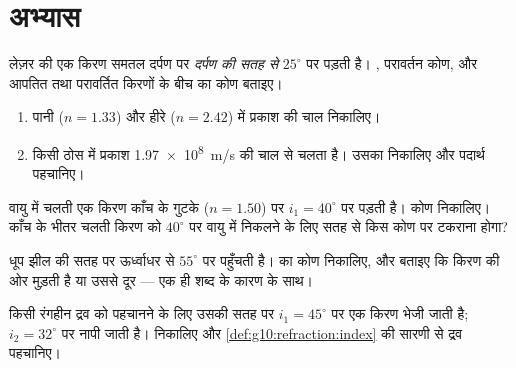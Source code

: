 \section{अभ्यास}

\begin{exercise}[$\star$]\label{exo:g10:refraction:1}
लेज़र की एक किरण समतल दर्पण पर \emph{दर्पण की सतह से} $25^\circ$ पर पड़ती
है। , परावर्तन कोण, और आपतित तथा परावर्तित किरणों के
बीच का कोण बताइए।
\end{exercise}

\begin{exercise}[$\star$]\label{exo:g10:refraction:2}
\begin{enumerate}
  \item पानी ($n = 1.33$) और हीरे ($n = 2.42$) में प्रकाश की चाल निकालिए।
  \item किसी ठोस में प्रकाश \qty{1.97e8}{m/s} की चाल से चलता है। उसका
         निकालिए और पदार्थ पहचानिए।
\end{enumerate}
\end{exercise}

\begin{exercise}[$\star$]\label{exo:g10:refraction:3}
वायु में चलती एक किरण काँच के गुटके ($n = 1.50$) पर $i_1 = 40^\circ$ पर पड़ती है।
 कोण निकालिए। काँच के भीतर चलती किरण को $40^\circ$ पर वायु
में निकलने के लिए सतह से किस कोण पर टकराना होगा?
\end{exercise}

\begin{exercise}[$\star$]\label{exo:g10:refraction:4}
धूप झील की सतह पर ऊर्ध्वाधर से $55^\circ$ पर पहुँचती है।
 का कोण निकालिए, और बताइए कि किरण 
की ओर मुड़ती है या उससे दूर --- एक ही शब्द के कारण के साथ।
\end{exercise}

\begin{exercise}[$\star$]\label{exo:g10:refraction:5}
किसी रंगहीन द्रव को पहचानने के लिए उसकी सतह पर $i_1 = 45^\circ$ पर एक किरण भेजी
जाती है;  $i_2 = 32^\circ$ पर नापी जाती है।
 निकालिए और \cref{def:g10:refraction:index} की सारणी से द्रव पहचानिए।
\end{exercise}

